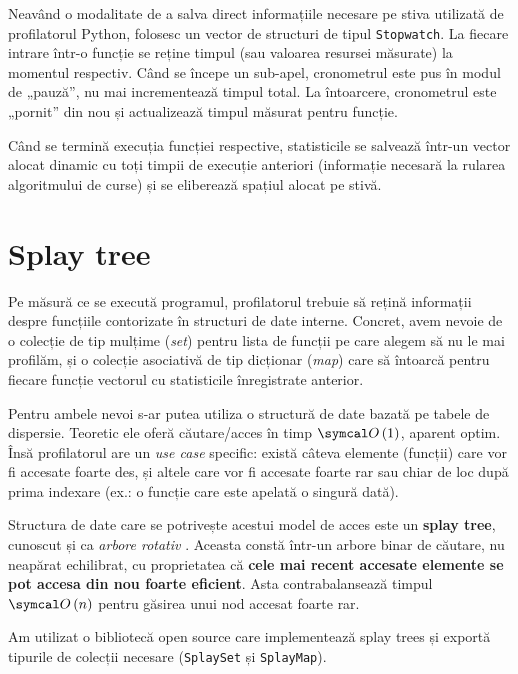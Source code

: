 Neavând o modalitate de a salva direct informațiile necesare pe stiva utilizată de profilatorul Python, folosesc un vector de structuri de tipul \texttt{Stopwatch}. La fiecare intrare într-o funcție se reține timpul (sau valoarea resursei măsurate) la momentul respectiv. Când se începe un sub-apel, cronometrul este pus în modul de „pauză”, nu mai incrementează timpul total. La întoarcere, cronometrul este „pornit” din nou și actualizează timpul măsurat pentru funcție.

Când se termină execuția funcției respective, statisticile se salvează într-un vector alocat dinamic cu toți timpii de execuție anteriori (informație necesară la rularea algoritmului de curse) și se eliberează spațiul alocat pe stivă.

\section{Splay tree}

Pe măsură ce se execută programul, profilatorul trebuie să rețină informații despre funcțiile contorizate în structuri de date interne. Concret, avem nevoie de o colecție de tip mulțime (\textit{set}) pentru lista de funcții pe care alegem să nu le mai profilăm, și o colecție asociativă de tip dicționar (\textit{map}) care să întoarcă pentru fiecare funcție vectorul cu statisticile înregistrate anterior.

Pentru ambele nevoi s-ar putea utiliza o structură de date bazată pe tabele de dispersie. Teoretic ele oferă căutare/acces în timp \(\bigO{1}\), aparent optim. Însă profilatorul are un \textit{use case} specific: există câteva elemente (funcții) care vor fi accesate foarte des, și altele care vor fi accesate foarte rar sau chiar de loc după prima indexare (ex.: o funcție care este apelată o singură dată).

Structura de date care se potrivește acestui model de acces este un \textbf{splay tree}, cunoscut și ca \emph{arbore rotativ} \cite{splay_tree}. Aceasta constă într-un arbore binar de căutare, nu neapărat echilibrat, cu proprietatea că \textbf{cele mai recent accesate elemente se pot accesa din nou foarte eficient}. Asta contrabalansează timpul \(\bigO{n}\) pentru găsirea unui nod accesat foarte rar.


Am utilizat o bibliotecă open source care implementează splay trees \cite{splay} și exportă tipurile de colecții necesare (\texttt{SplaySet} și \texttt{SplayMap}).

